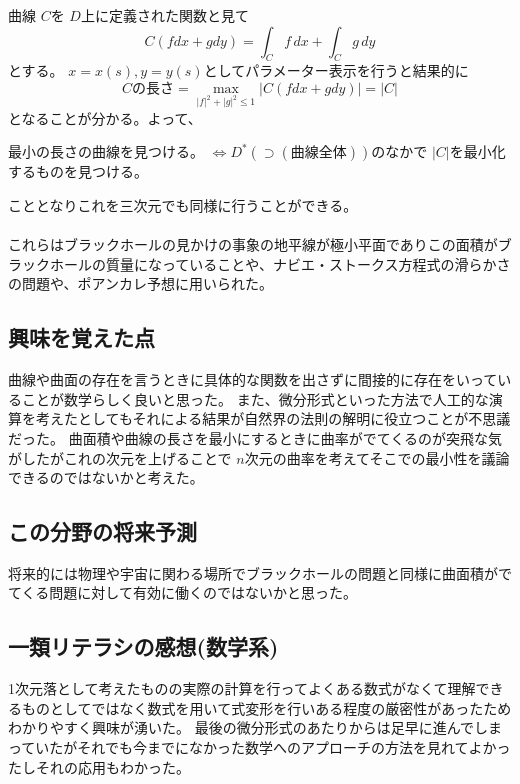 \documentclass[dvipdfmx]{jsarticle}
\begin{document}
\begin{multicols}{2}
     曲線 $C$を $D$上に定義された関数と見て
    \[
    C(fdx + gdy) = \int_C f \, dx + \int_C g \, dy
    \]
    とする。 $x = x(s) , y = y(s)$としてパラメーター表示を行うと結果的に
    \[
    Cの長さ = \max_{|f|^2 + |g|^2 \leq 1} \left|C(fdx + gdy) \right| = |C|
    \]
    となることが分かる。よって、

    最小の長さの曲線を見つける。 $\Leftrightarrow D^* (\supset (曲線全体))$のなかで $|C|$を最小化するものを見つける。

    こととなりこれを三次元でも同様に行うことができる。
    \\
    \\
    これらはブラックホールの見かけの事象の地平線が極小平面でありこの面積がブラックホールの質量になっていることや、ナビエ・ストークス方程式の滑らかさの問題や、ポアンカレ予想に用いられた。
    \subsection{興味を覚えた点}
    曲線や曲面の存在を言うときに具体的な関数を出さずに間接的に存在をいっていることが数学らしく良いと思った。
    また、微分形式といった方法で人工的な演算を考えたとしてもそれによる結果が自然界の法則の解明に役立つことが不思議だった。
    曲面積や曲線の長さを最小にするときに曲率がでてくるのが突飛な気がしたがこれの次元を上げることで $n$次元の曲率を考えてそこでの最小性を議論できるのではないかと考えた。
    \subsection{この分野の将来予測}
    将来的には物理や宇宙に関わる場所でブラックホールの問題と同様に曲面積がでてくる問題に対して有効に働くのではないかと思った。
    \subsection{一類リテラシの感想(数学系)}
    1次元落として考えたものの実際の計算を行ってよくある数式がなくて理解できるものとしてではなく数式を用いて式変形を行いある程度の厳密性があったためわかりやすく興味が湧いた。
    最後の微分形式のあたりからは足早に進んでしまっていたがそれでも今までになかった数学へのアプローチの方法を見れてよかったしそれの応用もわかった。
    \clearpage
\end{multicols}
\end{document}
